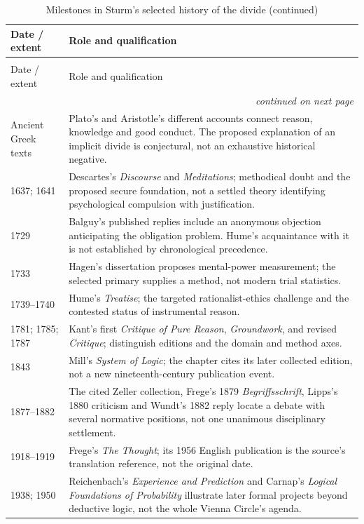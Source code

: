 \begingroup\small
\begin{longtable}{@{}p{}p{}@{}}
\caption{Milestones in Sturm's selected history of the divide.}
\label{tab:p13-r11-chronology}\\
\toprule
Date / extent & Role and qualification \\
\midrule
\endfirsthead
\caption[]{Milestones in Sturm's selected history of the divide (continued)}\\
\toprule
Date / extent & Role and qualification \\
\midrule
\endhead
\midrule\multicolumn{2}{r}{\emph{continued on next page}}\\
\endfoot
\endlastfoot
Ancient Greek texts & Plato's and Aristotle's different accounts connect
reason, knowledge and good conduct. The proposed explanation of an
implicit divide is conjectural, not an exhaustive historical negative. \\
1637; 1641 & Descartes's \emph{Discourse} and \emph{Meditations};
methodical doubt and the proposed secure foundation, not a settled
theory identifying psychological compulsion with justification. \\
1729 & Balguy's published replies include an anonymous objection
anticipating the obligation problem. Hume's acquaintance with it is
not established by chronological precedence. \\
1733 & Hagen's dissertation proposes mental-power measurement;
the selected primary supplies a method, not modern trial statistics. \\
1739--1740 & Hume's \emph{Treatise}; the targeted rationalist-ethics
challenge and the contested status of instrumental reason. \\
1781; 1785; 1787 & Kant's first \emph{Critique of Pure Reason},
\emph{Groundwork}, and revised \emph{Critique}; distinguish editions and the
domain and method axes. \\
1843 & Mill's \emph{System of Logic}; the chapter cites its later
collected edition, not a new nineteenth-century publication event. \\
1877--1882 & The cited Zeller collection, Frege's 1879 \emph{Begriffsschrift},
Lipps's 1880 criticism and Wundt's 1882 reply locate a debate with
several normative positions, not one unanimous disciplinary settlement. \\
1918--1919 & Frege's \emph{The Thought}; its 1956 English publication is
the source's translation reference, not the original date. \\
1938; 1950 & Reichenbach's \emph{Experience and Prediction} and Carnap's
\emph{Logical Foundations of Probability} illustrate later formal
projects beyond deductive logic, not the whole Vienna Circle's agenda. \\
\bottomrule
\end{longtable}
\endgroup

